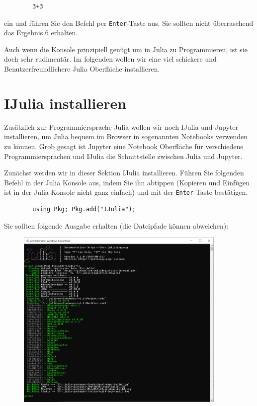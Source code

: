 \documentclass[11pt, a4paper]{scrartcl}
\begin{document}
	\begin{lstlisting}
		3+3
	\end{lstlisting}
	
	ein und führen Sie den Befehl per \texttt{Enter}-Taste aus. Sie sollten nicht überraschend das Ergebnis 6 erhalten.
	
	\vspace{1cm}
	
	Auch wenn die Konsole prinzipiell genügt um in Julia zu Programmieren, ist sie doch sehr rudimentär. Im folgenden wollen wir eine viel schickere und Benutzerfreundlichere Julia Oberfläche installieren.
	
	
	
	
	
	
	
	
	
	
	
	\newpage
	\section{IJulia installieren}
	
	Zusätzlich zur Programmiersprache Julia wollen wir noch IJulia und Jupyter installieren, um Julia bequem im Browser in sogenannten Notebooks verwenden zu können. Grob gesagt ist Jupyter eine Notebook Oberfläche für verschiedene Programmiersprachen und IJulia die Schnittstelle zwischen Julia und Jupyter. 
	
	
	Zunächst werden wir in dieser Sektion IJulia installieren. Führen Sie folgenden Befehl in der Julia Konsole aus, indem Sie ihn abtippen (Kopieren und Einfügen ist in der Julia Konsole nicht ganz einfach) und mit der \texttt{Enter}-Taste bestätigen.
	
	\begin{lstlisting}
		using Pkg; Pkg.add("IJulia");
	\end{lstlisting}

	Sie sollten folgende Ausgabe erhalten (die Dateipfade können abweichen):
	
	\begin{figure}[h!]
	\centering
	\includegraphics[width=0.9\textwidth]{imgs/IJulia_install.png}
	\end{figure}
\end{document}
